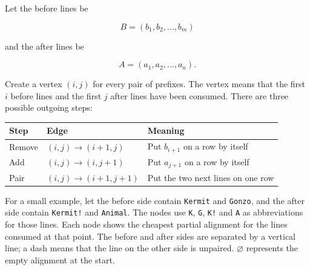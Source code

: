 \documentclass[
]{article}
\begin{document}
Let the before lines be

\[B = (b_1, b_2, \ldots, b_m)\]

and the after lines be

\[A = (a_1, a_2, \ldots, a_n).\]

Create a vertex \((i,j)\) for every pair of prefixes. The vertex means
that the first \(i\) before lines and the first \(j\) after lines have
been consumed. There are three possible outgoing steps:

\begin{longtable}[]{@{}lll@{}}
\toprule
Step & Edge & Meaning\tabularnewline
\midrule
\endhead
Remove & \((i,j) \rightarrow (i+1,j)\) & Put \(b_{i+1}\) on a row by
itself\tabularnewline
Add & \((i,j) \rightarrow (i,j+1)\) & Put \(a_{j+1}\) on a row by
itself\tabularnewline
Pair & \((i,j) \rightarrow (i+1,j+1)\) & Put the two next lines on one
row\tabularnewline
\bottomrule
\end{longtable}

For a small example, let the before side contain \texttt{Kermit} and
\texttt{Gonzo}, and the after side contain \texttt{Kermit!} and
\texttt{Animal}. The nodes use \texttt{K}, \texttt{G}, \texttt{K!} and
\texttt{A} as abbreviations for those lines. Each node shows the cheapest
partial alignment for the lines consumed at that point. The before and
after sides are separated by a vertical line; a dash means that the line
on the other side is unpaired. \(\varnothing\) represents the empty
alignment at the start.
\end{document}
